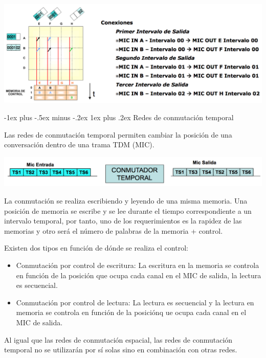 \documentclass[10pt,portrait, twocolumn]{article}
\makeatletter
\renewcommand{\subsubsection}{\@startsection{subsubsection}{3}{0mm}%
                                {-1ex plus -.5ex minus -.2ex}%
                                {1ex plus .2ex}%
                                {\normalfont\small\bfseries}}
\makeatother
\begin{document}
	\begin{center}
		\includegraphics[scale = 0.3]{ee}
	\end{center}
	
\subsubsection{Redes de conmutación temporal}

Las redes de conmutación temporal permiten cambiar la posición de una conversación dentro de una trama TDM (MIC).

	\begin{center}
		\includegraphics[scale = 0.3]{temporal}
	\end{center}

La conmutación se realiza escribiendo y leyendo de una misma memoria. Una posición de memoria se escribe y se lee durante el tiempo correspondiente a un intervalo temporal, por tanto, uno de los requerimientos es la rapidez de las memorias y otro será el número de palabras de la memoria + control.

Existen dos tipos en función de dónde se realiza el control:

	\begin{itemize}
		\item Conmutación por control de escritura: La escritura en la memoria se controla en función de la posición que ocupa cada canal en el MIC de salida, la lectura es secuencial.
		\item Conmutación por control de lectura: La lectura es secuencial y la lectura en memoria se controla en función de la posiciónq ue ocupa cada canal en el MIC de salida.
	\end{itemize}
	
Al igual que las redes de conmutación espacial, las redes de conmutación temporal no se utilizarán por sí solas sino en combinación con otras redes.
\end{document}
